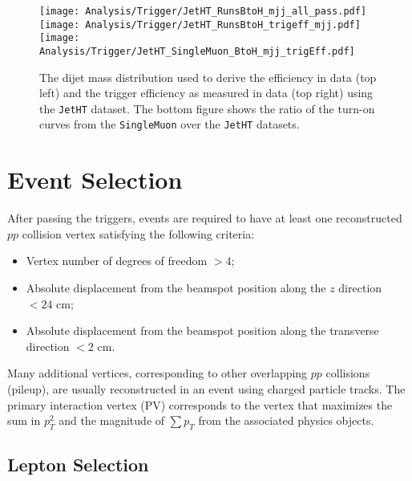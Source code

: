 \begin{figure}[H]
  \begin{center}
    \texttt{[image: Analysis/Trigger/JetHT\_RunsBtoH\_mjj\_all\_pass.pdf]}
    \texttt{[image: Analysis/Trigger/JetHT\_RunsBtoH\_trigeff\_mjj.pdf]}
    \texttt{[image: Analysis/Trigger/JetHT\_SingleMuon\_BtoH\_mjj\_trigEff.pdf]}
  \end{center}
  \caption{The dijet mass distribution used to derive the efficiency in data (top left) and the trigger efficiency as measured in data (top right) using the \texttt{JetHT} dataset. The bottom figure shows the ratio of the turn-on curves from the \texttt{SingleMuon} over the \texttt{JetHT} datasets.}
  \label{fig:Mjj_trigeEffvsMjj_JetHT}
\end{figure}

\section{Event Selection}
\label{sec:EvtSel}

After passing the triggers, events are required to have at least one reconstructed $pp$ collision vertex satisfying the following criteria:
\begin{itemize}
  \item Vertex number of degrees of freedom $> 4$;
  \item Absolute displacement from the beamspot position along the $z$ direction $< 24$ cm;
  \item Absolute displacement from the beamspot position along the transverse direction $< 2$ cm.
\end{itemize}

\noindent
Many additional vertices, corresponding to other overlapping $pp$ collisions (pileup), are usually reconstructed in an event using charged particle tracks. The primary interaction vertex (PV) corresponds to the vertex that maximizes the sum in $p_{T}^2$ and the magnitude of $\sum{p_{T}}$ from the associated physics objects.

\subsection{Lepton Selection}

